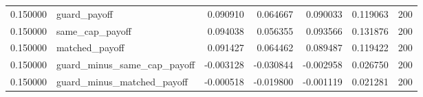 \begin{tabular}{rlrrrrr}
0.150000 & guard\_payoff & 0.090910 & 0.064667 & 0.090033 & 0.119063 & 200 \\
0.150000 & same\_cap\_payoff & 0.094038 & 0.056355 & 0.093566 & 0.131876 & 200 \\
0.150000 & matched\_payoff & 0.091427 & 0.064462 & 0.089487 & 0.119422 & 200 \\
0.150000 & guard\_minus\_same\_cap\_payoff & -0.003128 & -0.030844 & -0.002958 & 0.026750 & 200 \\
0.150000 & guard\_minus\_matched\_payoff & -0.000518 & -0.019800 & -0.001119 & 0.021281 & 200 \\
\bottomrule
\end{tabular}
